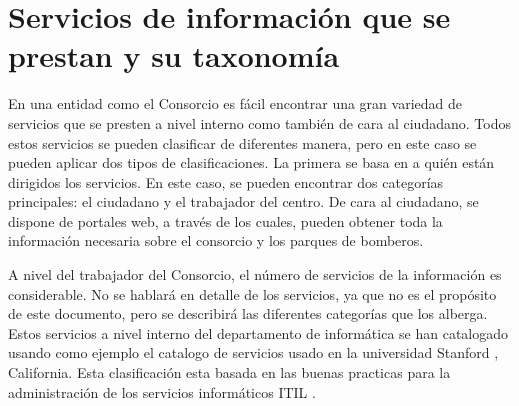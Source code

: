 \documentclass[12pt,a4paper,titlepage,twoside]{report}
\begin{document}
\section{Servicios de información que se prestan y su taxonomía}
En una entidad como el Consorcio es fácil encontrar una gran variedad de servicios que se presten a nivel interno como también de cara al ciudadano. Todos estos servicios se pueden clasificar de diferentes manera, pero en este caso se pueden aplicar dos tipos de clasificaciones. La primera se basa en a quién están dirigidos los servicios. En este caso, se pueden encontrar dos categorías principales: el ciudadano y el trabajador del centro. De cara al ciudadano, se dispone de portales web, a través de los cuales, pueden obtener toda la información necesaria sobre el consorcio y los parques de bomberos. 

A nivel del trabajador del Consorcio, el número de servicios de la información es considerable. No se hablará en detalle de los servicios, ya que no es el propósito de este documento, pero se describirá las diferentes categorías que los alberga. Estos servicios a nivel interno del departamento de informática se han catalogado usando como ejemplo el catalogo de servicios usado en la universidad Stanford \cite{Stanford}, California. Esta clasificación esta basada en las buenas practicas para la administración de los servicios informáticos ITIL \cite{ITIL}.
\end{document}
